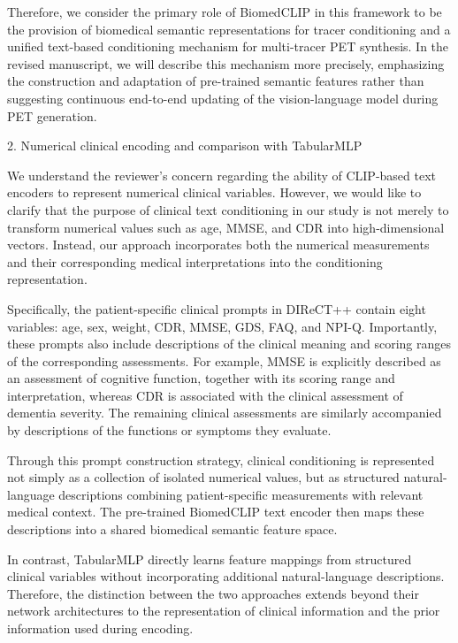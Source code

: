 {Therefore, we consider the primary role of BiomedCLIP in this framework to be the provision of biomedical semantic representations for tracer conditioning and a unified text-based conditioning mechanism for multi-tracer PET synthesis. In the revised manuscript, we will describe this mechanism more precisely, emphasizing the construction and adaptation of pre-trained semantic features rather than suggesting continuous end-to-end updating of the vision-language model during PET generation.

2. Numerical clinical encoding and comparison with TabularMLP

We understand the reviewer’s concern regarding the ability of CLIP-based text encoders to represent numerical clinical variables. However, we would like to clarify that the purpose of clinical text conditioning in our study is not merely to transform numerical values such as age, MMSE, and CDR into high-dimensional vectors. Instead, our approach incorporates both the numerical measurements and their corresponding medical interpretations into the conditioning representation.

Specifically, the patient-specific clinical prompts in DIReCT++ contain eight variables: age, sex, weight, CDR, MMSE, GDS, FAQ, and NPI-Q. Importantly, these prompts also include descriptions of the clinical meaning and scoring ranges of the corresponding assessments. For example, MMSE is explicitly described as an assessment of cognitive function, together with its scoring range and interpretation, whereas CDR is associated with the clinical assessment of dementia severity. The remaining clinical assessments are similarly accompanied by descriptions of the functions or symptoms they evaluate.

Through this prompt construction strategy, clinical conditioning is represented not simply as a collection of isolated numerical values, but as structured natural-language descriptions combining patient-specific measurements with relevant medical context. The pre-trained BiomedCLIP text encoder then maps these descriptions into a shared biomedical semantic feature space.

In contrast, TabularMLP directly learns feature mappings from structured clinical variables without incorporating additional natural-language descriptions. Therefore, the distinction between the two approaches extends beyond their network architectures to the representation of clinical information and the prior information used during encoding.

}
